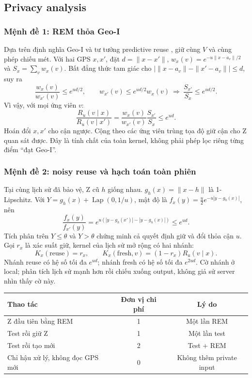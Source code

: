 \clearpage
\subsection{Privacy analysis}\label{sec:privacy}
\subsubsection{Mệnh đề 1: REM thỏa Geo-I}
Dựa trên định nghĩa Geo-I \cite{geoi} và tư tưởng predictive reuse \cite{predictive}, giữ cùng $V$ và cùng phép chiếu mét. Với hai GPS $x,x'$, đặt $d=\|x-x'\|$,
$w_x(v)=e^{-u\|x-a_v\|/2}$ và $S_x=\sum_vw_x(v)$.
Bất đẳng thức tam giác cho $|\|x-a_v\|-\|x'-a_v\||\le d$, suy ra
\begin{equation}
\frac{w_x(v)}{w_{x'}(v)}\le e^{ud/2},\qquad
w_{x'}(v)\le e^{ud/2}w_x(v)\ \Longrightarrow\ \frac{S_{x'}}{S_x}\le e^{ud/2}.
\end{equation}
Vì vậy, với mọi ứng viên $v$:
\begin{equation}
\boxed{\frac{R_u(v\mid x)}{R_u(v\mid x')}
=\frac{w_x(v)}{w_{x'}(v)}\frac{S_{x'}}{S_x}\le e^{ud}.}
\label{eq:remproof}
\end{equation}
Hoán đổi $x,x'$ cho cận ngược. Cộng theo các ứng viên trùng tọa độ giữ cận cho Z quan sát được.
Đây là tính chất của toàn kernel, không phải phép lọc riêng từng điểm ``đạt Geo-I''.

\subsubsection{Mệnh đề 2: noisy reuse và hạch toán toàn phiên}
Tại cùng lịch sử đã bảo vệ, Z cũ $h$ giống nhau. $g_h(x)=\|x-h\|$ là 1-Lipschitz.
Với $Y=g_h(x)+\operatorname{Lap}(0,1/u)$, mật độ là $f_x(y)=\frac u2e^{-u|y-g_h(x)|}$, nên
\begin{equation}
\frac{f_x(y)}{f_{x'}(y)}
=e^{u(|y-g_h(x')|-|y-g_h(x)|)}\le e^{ud}.
\label{eq:test}
\end{equation}
Tích phân trên $Y\le\theta$ và $Y>\theta$ chứng minh cả quyết định giữ và đổi thỏa cận $u$.
Gọi $r_x$ là xác suất giữ, kernel của lịch sử mở rộng có hai nhánh:
\[
K_x(\mathrm{reuse})=r_x,\qquad K_x(\mathrm{fresh},v)=(1-r_x)R_u(v\mid x).
\]
Nhánh reuse có hệ số tối đa $e^{ud}$; nhánh fresh có hệ số tối đa $e^{2ud}$.
Cờ nhánh ở local; phân tích lịch sử mạnh hơn rồi chiếu xuống output, không giả sử server nhìn thấy cờ này.

\begin{tabularx}{\linewidth}{@{}Ycc@{}}\toprule
\textbf{Thao tác} & \textbf{Đơn vị chi phí} & \textbf{Lý do}\\\midrule
Z đầu tiên bằng REM & 1 & Một lần REM\\
Test rồi giữ Z & 1 & Một lần test\\
Test rồi tạo mới & 2 & Test + REM\\
Chỉ hậu xử lý, không đọc GPS mới & 0 & Không thêm private input\\\bottomrule
\end{tabularx}

